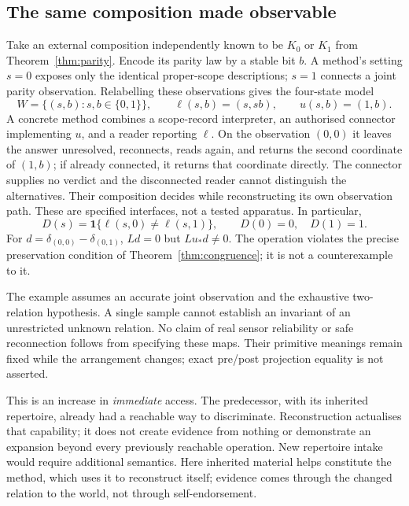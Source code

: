 \documentclass[11pt]{article}
\newcommand{\ind}{\mathbf 1}
\begin{document}
\subsection{The same composition made observable}\label{sec:reconnection}
Take an external composition independently known to be $K_0$ or $K_1$ from Theorem~\ref{thm:parity}. Encode its parity law by a stable bit $b$. A method's setting $s=0$ exposes only the identical proper-scope descriptions; $s=1$ connects a joint parity observation. Relabelling these observations gives the four-state model
\begin{equation}\label{eq:reconnection}
W=\{(s,b):s,b\in\{0,1\}\},\qquad
\ell(s,b)=(s,sb),\qquad u(s,b)=(1,b).
\end{equation}
A concrete method combines a scope-record interpreter, an authorised connector implementing $u$, and a reader reporting $\ell$. On the observation $(0,0)$ it leaves the answer unresolved, reconnects, reads again, and returns the second coordinate of $(1,b)$; if already connected, it returns that coordinate directly. The connector supplies no verdict and the disconnected reader cannot distinguish the alternatives. Their composition decides while reconstructing its own observation path. These are specified interfaces, not a tested apparatus. In particular,
\begin{equation}\label{eq:gain}
D(s)=\ind\{\ell(s,0)\ne\ell(s,1)\},\qquad D(0)=0,\quad D(1)=1.
\end{equation}
For $d=\delta_{(0,0)}-\delta_{(0,1)}$, $Ld=0$ but $Lu_*d\ne0$. The operation violates the precise preservation condition of Theorem~\ref{thm:congruence}; it is not a counterexample to it.

The example assumes an accurate joint observation and the exhaustive two-relation hypothesis. A single sample cannot establish an invariant of an unrestricted unknown relation. No claim of real sensor reliability or safe reconnection follows from specifying these maps. Their primitive meanings remain fixed while the arrangement changes; exact pre/post projection equality is not asserted.

This is an increase in \emph{immediate} access. The predecessor, with its inherited repertoire, already had a reachable way to discriminate. Reconstruction actualises that capability; it does not create evidence from nothing or demonstrate an expansion beyond every previously reachable operation. New repertoire intake would require additional semantics. Here inherited material helps constitute the method, which uses it to reconstruct itself; evidence comes through the changed relation to the world, not through self-endorsement.
\end{document}
